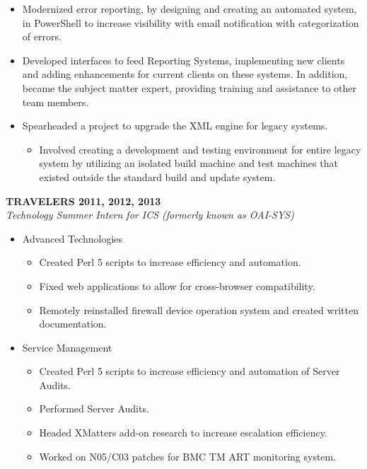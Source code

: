 \begin{cvparagraph}
\begin{itemize}
   \item Modernized error reporting, by designing and creating an automated system, 
      in PowerShell to increase visibility with email notification with categorization
      of errors.

   \item Developed interfaces to feed Reporting Systems, implementing new clients 
      and adding enhancements for current clients on these systems. In addition, 
      became the subject matter expert, providing training and assistance to 
      other team members.

   \item Spearheaded a project to upgrade the XML engine for legacy systems.
   \begin{itemize}
      \item Involved creating a development and testing environment for entire
         legacy system by utilizing an isolated build machine and test machines
         that existed outside the standard build and update system.
   \end{itemize}
\end{itemize}

\newpage

{\normalsize \textbf{ TRAVELERS \hfill 2011, 2012, 2013}} \\
{\sl Technology Summer Intern for ICS (formerly known as OAI-SYS)} \\

\begin{itemize}
   \item Advanced Technologies
   \begin{itemize}
      \item Created Perl 5 scripts to increase efficiency and automation.
      \item Fixed web applications to allow for cross-browser compatibility.
      \item Remotely reinstalled firewall device operation system and created 
         written documentation.
   \end{itemize}

   \item Service Management
   \begin{itemize}
      \item Created Perl 5 scripts to increase efficiency and automation of 
         Server Audits.
      \item Performed Server Audits.
      \item Headed XMatters add-on research to increase escalation efficiency.
      \item Worked on N05/C03 patches for BMC TM ART monitoring system.
   \end{itemize}


\end{itemize}
\end{cvparagraph}
